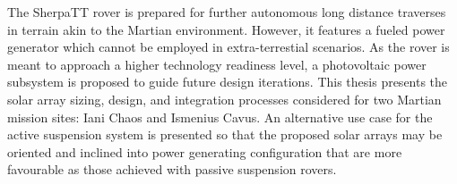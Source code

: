 \vspace{-3ex}

The SherpaTT rover is prepared for further autonomous long distance traverses in terrain akin to the Martian environment. However, it features a fueled power generator which cannot be employed in extra-terrestial scenarios. As the rover is meant to approach a higher technology readiness level, a photovoltaic power subsystem is proposed to guide future design iterations. This thesis presents the solar array sizing, design, and integration processes considered for two Martian mission sites: Iani Chaos and Ismenius Cavus. An alternative use case for the active suspension system is presented so that the proposed solar arrays may be oriented and inclined into power generating configuration that are more favourable as those achieved with passive suspension rovers.

